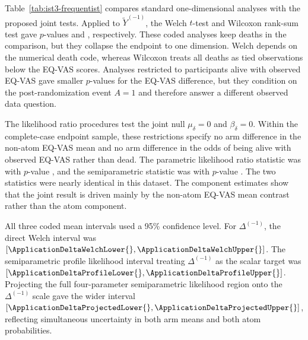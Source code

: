 \documentclass[11pt]{article}
\begin{document}
Table~\ref{tab:ist3-frequentist} compares standard one-dimensional analyses with the proposed joint tests. Applied to $\widetilde{Y}^{(-1)}$, the Welch $t$-test and Wilcoxon rank-sum test gave $p$-values \ApplicationTTestP{} and \ApplicationWilcoxP{}, respectively. These coded analyses keep deaths in the comparison, but they collapse the endpoint to one dimension. Welch depends on the numerical death code, whereas Wilcoxon treats all deaths as tied observations below the EQ-VAS scores. Analyses restricted to participants alive with observed EQ-VAS gave smaller $p$-values for the EQ-VAS difference, but they condition on the post-randomization event $A=1$ and therefore answer a different observed data question.



The likelihood ratio procedures test the joint null $\mu_\delta=0$ and $\beta_\delta=0$. Within the complete-case endpoint sample, these restrictions specify no arm difference in the non-atom EQ-VAS mean and no arm difference in the odds of being alive with observed EQ-VAS rather than dead. The parametric likelihood ratio statistic was \ApplicationLRTStatistic{} with $p$-value \ApplicationLRTP{}, and the semiparametric statistic was \ApplicationSPLRTStatistic{} with $p$-value \ApplicationSPLRTP{}. The two statistics were nearly identical in this dataset. The component estimates show that the joint result is driven mainly by the non-atom EQ-VAS mean contrast rather than the atom component.

All three coded mean intervals used a 95\% confidence level. For $\Delta^{(-1)}$, the direct Welch interval was $[\ApplicationDeltaWelchLower{}, \ApplicationDeltaWelchUpper{}]$. The semiparametric profile likelihood interval treating $\Delta^{(-1)}$ as the scalar target was $[\ApplicationDeltaProfileLower{}, \ApplicationDeltaProfileUpper{}]$. Projecting the full four-parameter semiparametric likelihood region onto the $\Delta^{(-1)}$ scale gave the wider interval $[\ApplicationDeltaProjectedLower{}, \ApplicationDeltaProjectedUpper{}]$, reflecting simultaneous uncertainty in both arm means and both atom probabilities.
\end{document}
